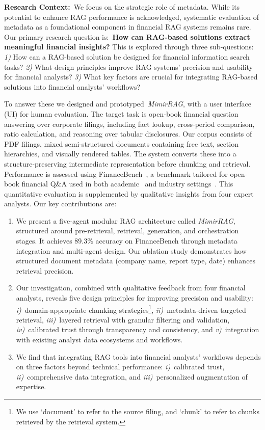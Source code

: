 \documentclass[final,5p,times,twopage,twocolumn,a4paper]{elsarticle}
\begin{document}
\textbf{Research Context:}~We focus on the strategic role of metadata. While its potential to enhance RAG performance is acknowledged, systematic evaluation of metadata as a foundational component in financial RAG systems remains rare. Our primary research question is:~\textbf{How can RAG-based solutions extract meaningful financial insights?} This is explored through three sub-questions: \textit{1)} How can a RAG-based solution be designed for financial information search tasks? \textit{2)} What design principles improve RAG systems' precision and usability for financial analysts? \textit{3)} What key factors are crucial for integrating RAG-based solutions into financial analysts' workflows?

To answer these we designed and prototyped~\textit{MimirRAG}, with a user interface (UI) for human evaluation. The target task is open-book financial question answering over corporate filings, including fact lookup, cross-period comparison, ratio calculation, and reasoning over tabular disclosures. Our corpus consists of PDF filings, mixed semi-structured documents containing free text, section hierarchies, and visually rendered tables. The system converts these into a structure-preserving intermediate representation before chunking and retrieval. Performance is assessed using FinanceBench~\cite{islam2023financebench}, a benchmark tailored for open-book financial Q\&A used in both academic~\cite{lee2024multireranker,setty2024improving} and industry settings~\cite{Leng2024LongCRA,rafiq2024ragie,rafiq2024ragie2,vectify2025mafingithub}. This quantitative evaluation is supplemented by qualitative insights from four expert analysts. Our key contributions are:
%
\begin{enumerate}
    \item We present a five-agent modular RAG architecture called \textit{MimirRAG}, structured around pre-retrieval, retrieval, generation, and orchestration stages. It achieves 89.3\% accuracy on FinanceBench through metadata integration and multi-agent design. Our ablation study demonstrates how structured document metadata (company name, report type, date) enhances retrieval precision.
    
   \item Our investigation, combined with qualitative feedback from four financial analysts, reveals five design principles for improving precision and usability: \textit{i)}~domain-appropriate chunking strategies\footnote{We use `document' to refer to the source filing, and `chunk' to refer to chunks retrieved by the retrieval system.}, \textit{ii)}~metadata-driven targeted retrieval, \textit{iii)}~layered retrieval with granular filtering and validation, \textit{iv)}~calibrated trust through transparency and consistency, and \textit{v)}~integration with existing analyst data ecosystems and workflows.
   
   \item We find that integrating RAG tools into financial analysts' workflows depends on three factors beyond technical performance: \textit{i)}~calibrated trust, \textit{ii)}~comprehensive data integration, and \textit{iii)}~personalized augmentation of expertise.  
\end{enumerate}
%
\end{document}
